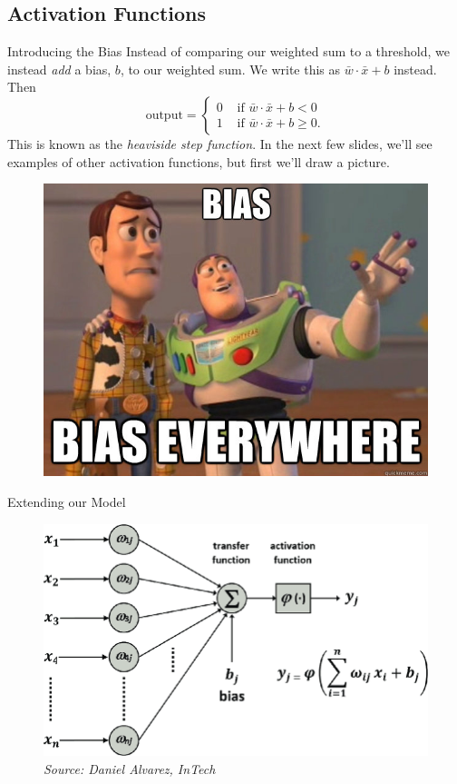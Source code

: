 \documentclass[xcolor=dvipsnames, fontsize=11pt, %
pagesize, %
parskip=half-, t]{beamer}
\begin{document}
\subsection{Activation Functions}
\begin{frame}[c]{Introducing the Bias}
Instead of comparing our weighted sum to a threshold, we instead \textit{add} a bias, $b$, to our weighted sum. We write this as $\bar{w}\cdot \bar{x}+b$ instead. \pause Then $$\text{output}=\begin{cases} 0 & \text{ if } \bar{w}\cdot \bar{x}+b<0 \\ 
1 & \text{ if } \bar{w}\cdot \bar{x}+b\ge 0. \end{cases}$$
This is known as the \textit{heaviside step function}. In the next few slides, we'll see examples of other activation functions, but first we'll draw a picture. \pause
\begin{figure}
\includegraphics[scale=0.23]{bias.jpg} 
\end{figure}
\end{frame}
\begin{frame}{Extending our Model}
\begin{figure}
\center
\includegraphics[scale=0.36]{perceptron.png}
\caption{\textit{Source: Daniel Alvarez, InTech}}
\end{figure}
\end{frame}
\end{document}

